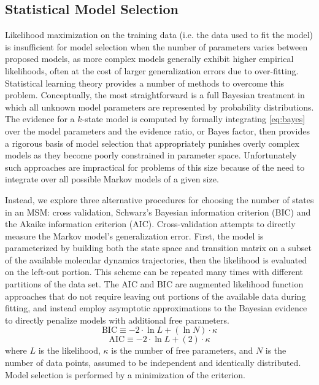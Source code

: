 \documentclass[journal=jpcbfk, layout=traditional, manuscript=article]{achemso}
\begin{document}
\subsection{Statistical Model Selection}
Likelihood maximization on the training data (i.e. the data used to fit the model) is insufficient for model selection when the number of parameters varies between proposed models, as more complex models generally exhibit higher empirical likelihoods, often at the cost of larger generalization errors due to over-fitting\cite{Liddle2007Information, Hastie01Elements}. Statistical learning theory provides a number of methods to overcome this problem. Conceptually, the most straightforward is a full Bayesian treatment in which all unknown model parameters are represented by probability distributions. The evidence for a $k$-state model is computed by formally integrating \cref{eq:bayes} over the model parameters and the evidence ratio, or Bayes factor\cite{Gelfand94Bayesian}, then provides a rigorous basis of model selection that appropriately punishes overly complex models as they become poorly constrained in parameter space. Unfortunately such approaches are impractical for problems of this size because of the need to integrate over all possible Markov models of a given size.

Instead, we explore three alternative procedures for choosing the number of states in an MSM: cross validation, Schwarz's Bayesian information criterion (BIC)\cite{Schwartz78Estimating} and the Akaike information criterion (AIC)\cite{Akaike1974AIC}. Cross-validation attempts to directly measure the Markov model's generalization error. First, the model is parameterized by building both the state space and transition matrix on a subset of the available molecular dynamics trajectories, then the likelihood is evaluated on the left-out portion. This scheme can be repeated many times with different partitions of the data set. The AIC and BIC are augmented likelihood function approaches that do not require leaving out portions of the available data during fitting, and instead employ asymptotic approximations to the Bayesian evidence to directly penalize models with additional free parameters.
\begin{equation}
\label{eq:bic}
\mathrm{BIC} \equiv -2\cdot \ln L + \left(\ln N \right)\cdot \kappa
\end{equation}
\begin{equation}
\label{eq:aic}
\mathrm{AIC} \equiv -2\cdot \ln L + \left(2\right) \cdot \kappa
\end{equation} where $L$ is the likelihood, $\kappa$ is the number of free parameters, and $N$ is the number of data points, assumed to be independent and identically distributed. Model selection is performed by a minimization of the criterion.
\end{document}
